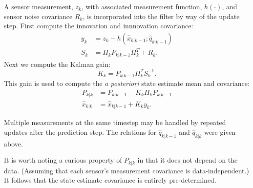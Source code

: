 \documentclass[a4paper]{paper}
\begin{document}
A sensor measurement, $z_k$, with associated measurement function, $h(\cdot)$,
and sensor noise covariance $R_k$, is incorporated into the filter by way of the
update step. First compute the innovation and innnovation covariance:
\begin{align*}
	y_k &= z_k - h(\hat{x}_{k|k-1}; \hat{q}_{k|k-1})\\
	S_k &= H_k P_{k|k-1} H^T_k + R_k.
\end{align*}
Next we compute the Kalman gain:
$$ K_k = P_{k|k-1} H^T_k S^{-1}_k. $$
This gain is used to compute the \emph{a posteriori} state estimate mean and covariance:
\begin{align*}
	P_{k|k} &= P_{k|k-1} - K_k H_kP_{k|k-1}\\
	\hat{x}_{k|k} &= \hat{x}_{k|k-1} + K_k y_k.
\end{align*}

Multiple measurements at the same timestep may be handled by repeated updates
after the prediction step. The relations for $\hat{q}_{k|k-1}$ and
$\hat{q}_{k|k}$ were given above.

It is worth noting a curious property of $P_{k|k}$ in that it does not depend
on the data. (Assuming that each sensor's measurement covariance is
data-independent.) It follows that the state estimate covariance is entirely
pre-determined.



\end{document}
